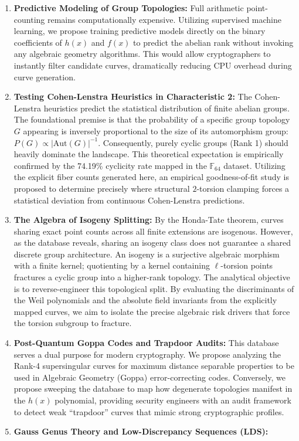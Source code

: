 \documentclass[11pt,letterpaper]{article}
\begin{document}
\begin{enumerate}
\item \textbf{Predictive Modeling of Group Topologies:} Full arithmetic point-counting remains computationally expensive. Utilizing supervised machine learning, we propose training predictive models directly on the binary coefficients of $h(x)$ and $f(x)$ to predict the abelian rank without invoking any algebraic geometry algorithms. This would allow cryptographers to instantly filter candidate curves, dramatically reducing CPU overhead during curve generation.
\item \textbf{Testing Cohen-Lenstra Heuristics in Characteristic 2:} The Cohen-Lenstra heuristics predict the statistical distribution of finite abelian groups. The foundational premise is that the probability of a specific group topology $G$ appearing is inversely proportional to the size of its automorphism group: $P(G) \propto |\text{Aut}(G)|^{-1}$. Consequently, purely cyclic groups (Rank 1) should heavily dominate the landscape. This theoretical expectation is empirically confirmed by the 74.19\% cyclicity rate mapped in the $\mathbb{F}_{64}$ dataset. Utilizing the explicit fiber counts generated here, an empirical goodness-of-fit study is proposed to determine precisely where structural $2$-torsion clamping forces a statistical deviation from continuous Cohen-Lenstra predictions.
\item \textbf{The Algebra of Isogeny Splitting:} By the Honda-Tate theorem, curves sharing exact point counts across all finite extensions are isogenous. However, as the database reveals, sharing an isogeny class does not guarantee a shared discrete group architecture. An isogeny is a surjective algebraic morphism with a finite kernel; quotienting by a kernel containing $\ell$-torsion points fractures a cyclic group into a higher-rank topology. The analytical objective is to reverse-engineer this topological split. By evaluating the discriminants of the Weil polynomials and the absolute field invariants from the explicitly mapped curves, we aim to isolate the precise algebraic risk drivers that force the torsion subgroup to fracture.
\item \textbf{Post-Quantum Goppa Codes and Trapdoor Audits:} This database serves a dual purpose for modern cryptography. We propose analyzing the Rank-4 supersingular curves for maximum distance separable properties to be used in Algebraic Geometry (Goppa) error-correcting codes. Conversely, we propose sweeping the database to map how degenerate topologies manifest in the $h(x)$ polynomial, providing security engineers with an audit framework to detect weak ``trapdoor'' curves that mimic strong cryptographic profiles.
\item \textbf{Gauss Genus Theory and Low-Discrepancy Sequences (LDS):} 


\end{enumerate}
\end{document}
